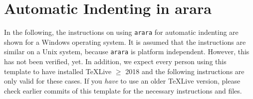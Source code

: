 \chapter{Automatic Indenting in arara}\label{ch:automatic_indenting_arara}
In the following, the instructions on using \verb+arara+ for automatic indenting are shown for a Windows operating system. It is assumed that the instructions are similar on a Unix system, because \verb+arara+ is platform independent. However, this has not been verified, yet. In addition, we expect every person using this template to have installed \TeX Live $\geq$ 2018 and the following instructions are only valid for these cases. If you \emph{have} to use an older \TeX Live version, please check earlier commits of this template for the necessary instructions and files.

